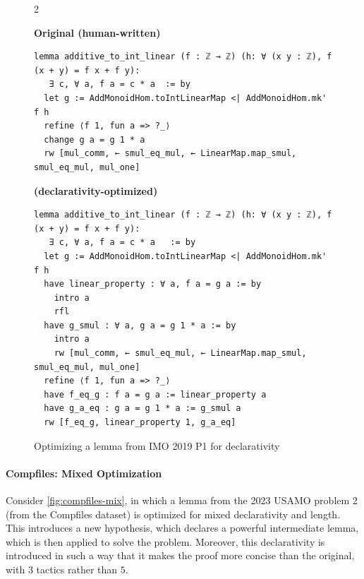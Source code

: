 \setlength{\columnsep}{0.2cm}
\begin{figure}[ht]
\begin{multicols}{2}

{
\textbf{Original (human-written)}
\begin{scriptsize}
\begin{lstlisting}[basicstyle=\scriptsize\ttfamily]
lemma additive_to_int_linear (f : ℤ → ℤ) (h: ∀ (x y : ℤ), f (x + y) = f x + f y):
   ∃ c, ∀ a, f a = c * a  := by
  let g := AddMonoidHom.toIntLinearMap <| AddMonoidHom.mk' f h
  refine ⟨f 1, fun a => ?_⟩
  change g a = g 1 * a
  rw [mul_comm, ← smul_eq_mul, ← LinearMap.map_smul, smul_eq_mul, mul_one]
\end{lstlisting}
\end{scriptsize}
}
\vfill\null
\columnbreak
{
\textbf{\methodname{} (declarativity-optimized)}
\begin{scriptsize}
\begin{lstlisting}[basicstyle=\scriptsize\ttfamily]
lemma additive_to_int_linear (f : ℤ → ℤ) (h: ∀ (x y : ℤ), f (x + y) = f x + f y):
   ∃ c, ∀ a, f a = c * a   := by
  let g := AddMonoidHom.toIntLinearMap <| AddMonoidHom.mk' f h
  have linear_property : ∀ a, f a = g a := by
    intro a
    rfl
  have g_smul : ∀ a, g a = g 1 * a := by
    intro a
    rw [mul_comm, ← smul_eq_mul, ← LinearMap.map_smul, smul_eq_mul, mul_one]
  refine ⟨f 1, fun a => ?_⟩
  have f_eq_g : f a = g a := linear_property a
  have g_a_eq : g a = g 1 * a := g_smul a
  rw [f_eq_g, linear_property 1, g_a_eq]
\end{lstlisting}
\end{scriptsize}
}
\end{multicols}
\vspace{-2.5em}
\caption{Optimizing a lemma from IMO 2019 P1 for declarativity}
\label{fig:compfiles-read}
\end{figure}

\vspace{15px}
\paragraph{Compfiles: Mixed Optimization}

Consider \autoref{fig:compfiles-mix}, in which a lemma from the 2023 USAMO problem 2 (from the Compfiles dataset) is optimized for mixed declarativity and length. This introduces a new hypothesis, which declares a powerful intermediate lemma, which is then applied to solve the problem. Moreover, this declarativity is introduced in such a way that it makes the proof more concise than the original, with $3$ tactics rather than $5$.


